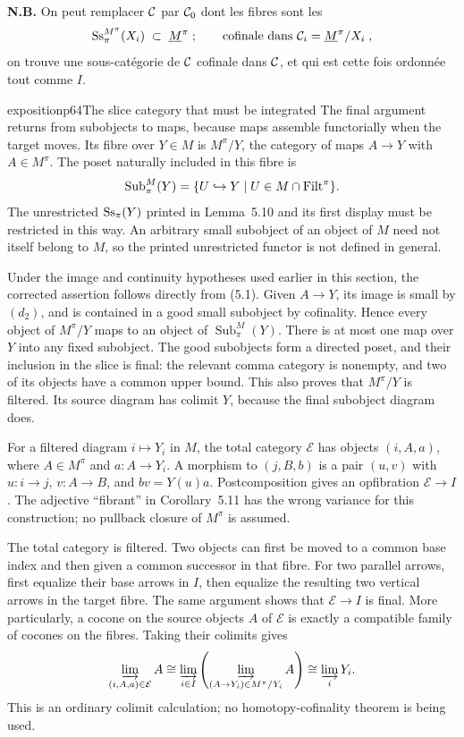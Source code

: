 \textbf{N.B.} On peut remplacer $\mathcal{C}$ par $\mathcal{C}_0$ dont les fibres sont les
\[
\mathrm{Ss}_\pi^{M^\pi}(X_i) \;\subset\; \underline{M}^\pi \;; \qquad \text{cofinale dans } \mathcal{C}_i = \underline{M}^\pi/X_i \;,
\]
on trouve une sous-catégorie de $\mathcal{C}$ cofinale dans $\mathcal{C}$, et qui est cette fois ordonnée tout comme $I$.

\begin{dcomment}{exposition}{p64}{The slice category that must be integrated}
The final argument returns from subobjects to maps, because maps assemble functorially when the target moves. Its fibre over $Y\in M$ is $M^\pi/Y$, the category of maps $A\to Y$ with $A\in M^\pi$. The poset naturally included in this fibre is
\[
 \operatorname{Sub}_{\pi}^{M}(Y)
 =\{U\hookrightarrow Y\mid U\in M\cap\mathrm{Filt}^\pi\}.
\]
The unrestricted $\mathrm{Ss}_\pi(Y)$ printed in Lemma~5.10 and its first display must be restricted in this way. An arbitrary small subobject of an object of $M$ need not itself belong to $M$, so the printed unrestricted functor is not defined in general.

Under the image and continuity hypotheses used earlier in this section, the corrected assertion follows directly from (5.1). Given $A\to Y$, its image is small by $(d_2)$, and is contained in a good small subobject by cofinality. Hence every object of $M^\pi/Y$ maps to an object of $\operatorname{Sub}_{\pi}^{M}(Y)$. There is at most one map over $Y$ into any fixed subobject. The good subobjects form a directed poset, and their inclusion in the slice is final: the relevant comma category is nonempty, and two of its objects have a common upper bound. This also proves that $M^\pi/Y$ is filtered. Its source diagram has colimit $Y$, because the final subobject diagram does.

For a filtered diagram $i\mapsto Y_i$ in $M$, the total category $\mathcal E$ has objects $(i,A,a)$, where $A\in M^\pi$ and $a:A\to Y_i$. A morphism to $(j,B,b)$ is a pair $(u,v)$ with $u:i\to j$, $v:A\to B$, and $bv=Y(u)a$. Postcomposition gives an opfibration $\mathcal E\to I$. The adjective ``fibrant'' in Corollary~5.11 has the wrong variance for this construction; no pullback closure of $M^\pi$ is assumed.

The total category is filtered. Two objects can first be moved to a common base index and then given a common successor in that fibre. For two parallel arrows, first equalize their base arrows in $I$, then equalize the resulting two vertical arrows in the target fibre. The same argument shows that $\mathcal E\to I$ is final. More particularly, a cocone on the source objects $A$ of $\mathcal E$ is exactly a compatible family of cocones on the fibres. Taking their colimits gives
\[
 \varinjlim_{(i,A,a)\in\mathcal E}A
 \cong \varinjlim_{i\in I}
          \left(\varinjlim_{(A\to Y_i)\in M^\pi/Y_i}A\right)
 \cong \varinjlim_iY_i.
\]
This is an ordinary colimit calculation; no homotopy-cofinality theorem is being used.


\end{dcomment}
